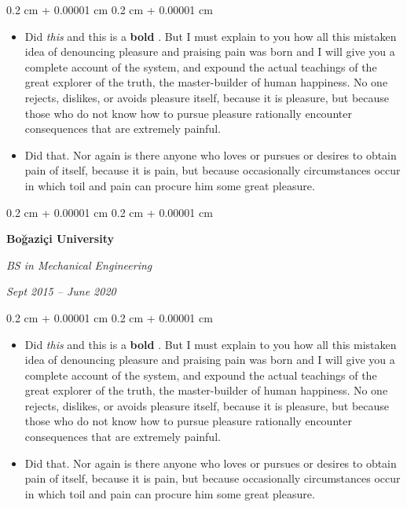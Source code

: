 \documentclass[10pt, letterpaper]{article}
\newenvironment{highlights}{
    \begin{itemize}[
        topsep=0.10 cm,
        parsep=0.10 cm,
        partopsep=0pt,
        itemsep=0pt,
        leftmargin=0.4 cm + 10pt
    ]
}{
    \end{itemize}
} %
\newenvironment{onecolentry}{
    \begin{adjustwidth}{
        0.2 cm + 0.00001 cm
    }{
        0.2 cm + 0.00001 cm
    }
}{
    \end{adjustwidth}
} %
\newenvironment{twocolentry}[2][]{
    \onecolentry
    \def\secondColumn{#2}
    \setcolumnwidth{\fill, 4.5 cm}
    \begin{paracol}{2}
}{
    \switchcolumn \raggedleft \secondColumn
    \end{paracol}
    \endonecolentry
} %
\let\hrefWithoutArrow\href
\renewcommand{\href}[2]{\hrefWithoutArrow{#1}{\ifthenelse{\equal{#2}{}}{ }{#2 }\raisebox{.15ex}{\footnotesize \faExternalLink*}}}
\begin{document}
        \vspace{0.10 cm}
        \begin{onecolentry}
            \begin{highlights}
                \item Did \textit{this} and this is a \textbf{bold} \href{https://example.com}{link}. But I must explain to you how all this mistaken idea of denouncing pleasure and praising pain was born and I will give you a complete account of the system, and expound the actual teachings of the great explorer of the truth, the master-builder of human happiness. No one rejects, dislikes, or avoids pleasure itself, because it is pleasure, but because those who do not know how to pursue pleasure rationally encounter consequences that are extremely painful.
                \item Did that. Nor again is there anyone who loves or pursues or desires to obtain pain of itself, because it is pain, but because occasionally circumstances occur in which toil and pain can procure him some great pleasure.
            \end{highlights}
        \end{onecolentry}


        \vspace{0.2 cm}

        \begin{twocolentry}{
            
            
        \textit{Sept 2015 – June 2020}}
            \textbf{Boğaziçi University}

            \textit{BS in Mechanical Engineering}
        \end{twocolentry}

        \vspace{0.10 cm}
        \begin{onecolentry}
            \begin{highlights}
                \item Did \textit{this} and this is a \textbf{bold} \href{https://example.com}{link}. But I must explain to you how all this mistaken idea of denouncing pleasure and praising pain was born and I will give you a complete account of the system, and expound the actual teachings of the great explorer of the truth, the master-builder of human happiness. No one rejects, dislikes, or avoids pleasure itself, because it is pleasure, but because those who do not know how to pursue pleasure rationally encounter consequences that are extremely painful.
                \item Did that. Nor again is there anyone who loves or pursues or desires to obtain pain of itself, because it is pain, but because occasionally circumstances occur in which toil and pain can procure him some great pleasure.
            \end{highlights}
        \end{onecolentry}
\end{document}

